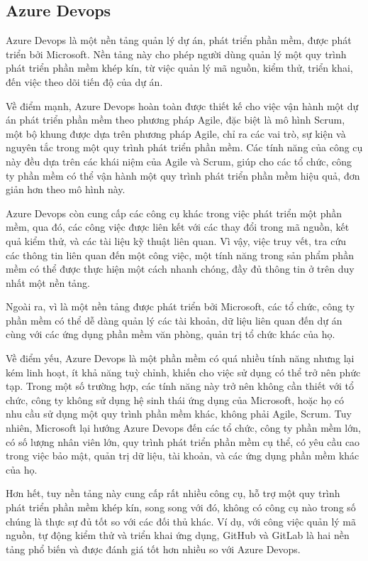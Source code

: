 \documentclass[../DoAn.tex]{subfiles}
\begin{document}
\label{subsection:2.1.2}
\subsection{Azure Devops}
Azure Devops là một nền tảng quản lý dự án, phát triển phần mềm, được phát triển bởi Microsoft. Nền tảng này cho phép người dùng quản lý một quy trình phát triển phần mềm
khép kín, từ việc quản lý mã nguồn, kiểm thử, triển khai, đến việc theo dõi tiến độ của dự án.

Về điểm mạnh, Azure Devops hoàn toàn được thiết kế cho việc vận hành một dự án phát triển phần mềm theo phương pháp Agile, đặc biệt là mô hình Scrum, một bộ khung được dựa
trên phương pháp Agile, chỉ ra các vai trò, sự kiện và nguyên tắc trong một quy trình phát triển phần mềm. Các tính năng của công cụ này đều dựa trên các khái niệm của Agile và Scrum,
giúp cho các tổ chức, công ty phần mềm có thể vận hành một quy trình phát triển phần mềm hiệu quả, đơn giản hơn theo mô hình này.

Azure Devops còn cung cấp các công cụ khác trong việc phát triển một phần mềm, qua đó, các công việc được liên kết với các thay đổi trong mã nguồn, kết quả kiểm thử,
và các tài liệu kỹ thuật liên quan. Vì vậy, việc truy vết, tra cứu các thông tin liên quan đến một công việc, một tính năng trong sản phẩm phần mềm có thể được thực hiện
một cách nhanh chóng, đầy đủ thông tin ở trên duy nhất một nền tảng.

Ngoài ra, vì là một nền tảng được phát triển bởi Microsoft, các tổ chức, công ty phần mềm có thể dễ dàng quản lý các tài khoản, dữ liệu liên quan đến dự án cùng với
các ứng dụng phần mềm văn phòng, quản trị tổ chức khác của họ.

Về điểm yếu, Azure Devops là một phần mềm có quá nhiều tính năng nhưng lại kém linh hoạt, ít khả năng tuỳ chỉnh, khiến cho việc sử dụng có thể trở nên phức tạp.
Trong một số trường hợp, các tính năng này trở nên không cần thiết với tổ chức, công ty không sử dụng hệ sinh thái ứng dụng của Microsoft, hoặc họ có nhu cầu sử dụng
một quy trình phần mềm khác, không phải Agile, Scrum. Tuy nhiên, Microsoft lại hướng Azure Devops đến các tổ chức, công ty phần mềm lớn, có số lượng nhân viên lớn,
quy trình phát triển phần mềm cụ thể, có yêu cầu cao trong việc bảo mật, quản trị dữ liệu, tài khoản, và các ứng dụng phần mềm khác của họ.

Hơn hết, tuy nền tảng này cung cấp rất nhiều công cụ, hỗ trợ một quy trình phát triển phần mềm khép kín, song song với đó, không có công cụ nào trong số chúng là thực
sự đủ tốt so với các đối thủ khác. Ví dụ, với công việc quản lý mã nguồn, tự động kiểm thử và triển khai ứng dụng, GitHub và GitLab là hai nền tảng phổ biến và được
đánh giá tốt hơn nhiều so với Azure Devops.
\end{document}
